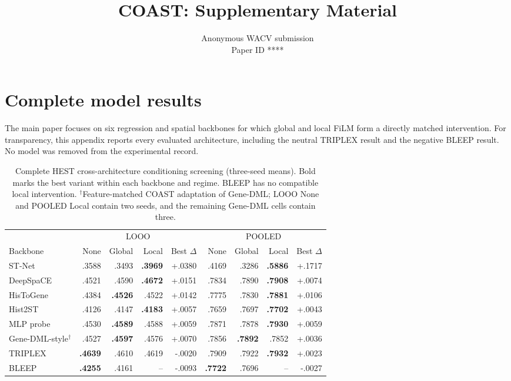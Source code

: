 \documentclass[10pt,twocolumn,letterpaper]{article}
\def\paperID{****}
\begin{document}
\title{COAST: Supplementary Material}
\author{Anonymous WACV submission\\Paper ID \paperID}
\maketitle

\section{Complete model results}
The main paper focuses on six regression and spatial backbones for which global and local FiLM form
a directly matched intervention. For transparency, this appendix reports every evaluated architecture,
including the neutral TRIPLEX result and the negative BLEEP result. No model was removed from the
experimental record.

\begin{table}[t]
\centering\small
\setlength{\tabcolsep}{4.2pt}
\begin{tabular}{lrrrrrrrr}
\toprule
& \multicolumn{4}{c}{LOOO} & \multicolumn{4}{c}{POOLED}\\
\cmidrule(lr){2-5}\cmidrule(lr){6-9}
Backbone & None & Global & Local & Best $\Delta$ & None & Global & Local & Best $\Delta$\\
\midrule
ST-Net & .3588 & .3493 & \textbf{.3969} & +.0380 & .4169 & .3286 & \textbf{.5886} & +.1717\\
DeepSpaCE & .4521 & .4590 & \textbf{.4672} & +.0151 & .7834 & .7890 & \textbf{.7908} & +.0074\\
HisToGene & .4384 & \textbf{.4526} & .4522 & +.0142 & .7775 & .7830 & \textbf{.7881} & +.0106\\
Hist2ST & .4126 & .4147 & \textbf{.4183} & +.0057 & .7659 & .7697 & \textbf{.7702} & +.0043\\
MLP probe & .4530 & \textbf{.4589} & .4588 & +.0059 & .7871 & .7878 & \textbf{.7930} & +.0059\\
Gene-DML-style$^\dagger$ & .4527 & \textbf{.4597} & .4576 & +.0070 & .7856 & \textbf{.7892} & .7852 & +.0036\\
TRIPLEX & \textbf{.4639} & .4610 & .4619 & -.0020 & .7909 & .7922 & \textbf{.7932} & +.0023\\
BLEEP & \textbf{.4255} & .4161 & -- & -.0093 & \textbf{.7722} & .7696 & -- & -.0027\\
\bottomrule
\end{tabular}
\caption{Complete HEST cross-architecture conditioning screening (three-seed means). Bold marks the
best variant within each backbone and regime. BLEEP has no compatible local intervention.
$^\dagger$Feature-matched COAST adaptation of Gene-DML; LOOO None and POOLED Local contain two seeds,
and the remaining Gene-DML cells contain three.}
\label{tab:all_film}
\end{table}
\end{document}

